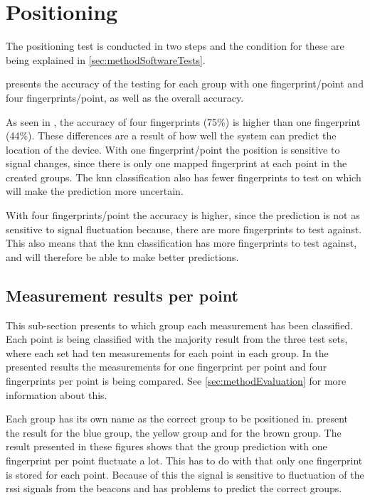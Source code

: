 \section{Positioning}\label{sec:resultPos}
The positioning test is conducted in two steps and the condition for these are being explained in \cref{sec:methodSoftwareTests}.

\bigskip

 presents the accuracy of the testing for each group with one fingerprint/point and four fingerprints/point, as well as the overall accuracy.


As seen in , the accuracy of four fingerprints (75\%) is higher than one fingerprint (44\%).
These differences are a result of how well the system can predict the location of the device.
With one fingerprint/point the position is sensitive to signal changes, since there is only one mapped fingerprint at each point in the created groups.
The \acrshort{knn} classification also has fewer fingerprints to test on which will make the prediction more uncertain.

\bigskip

With four fingerprints/point the accuracy is higher, since the prediction is not as sensitive to signal fluctuation because, there are more fingerprints to test against.
This also means that the \acrshort{knn} classification has more fingerprints to test against, and will therefore be able to make better predictions.


\subsection{Measurement results per point}\label{sec:resultsPosOneFingerprint}
This sub-section presents to which group each measurement has been classified.
Each point is being classified with the majority result from the three test sets, where each set had ten measurements for each point in each group.
In the presented results the measurements for one fingerprint per point and four fingerprints per point is being compared.
See \cref{sec:methodEvaluation} for more information about this.

\bigskip

Each group has its own name as the correct group to be positioned in.
 present the result for the blue group,  the yellow group and  for the brown group.
The result presented in these figures shows that the group prediction with one fingerprint per point fluctuate a lot.
This has to do with that only one fingerprint is stored for each point.
Because of this the signal is sensitive to fluctuation of the \acrshort{rssi} signals from the beacons and has problems to predict the correct groups.

